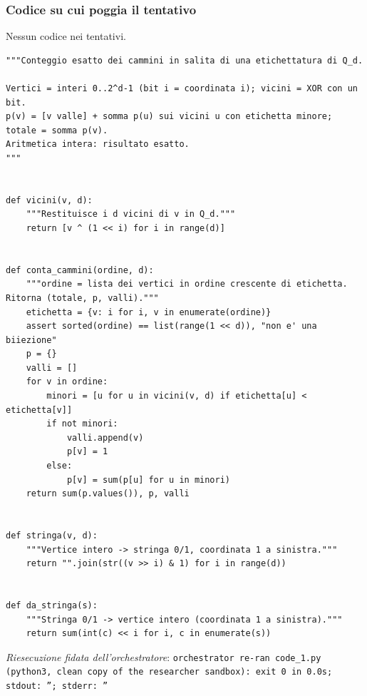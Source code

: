 \documentclass[11pt,a4paper]{article}
\begin{document}
\subsubsection{Codice su cui poggia il tentativo}
Nessun codice nei tentativi.
\begin{lstlisting}[caption={attempt\_001 code\_1 [python, rigore exact] — Exact count of uphill paths of a labelling of Q\_d via the recursion p(v) = [valley] + sum  — approvato dal Referee}]
"""Conteggio esatto dei cammini in salita di una etichettatura di Q_d.

Vertici = interi 0..2^d-1 (bit i = coordinata i); vicini = XOR con un bit.
p(v) = [v valle] + somma p(u) sui vicini u con etichetta minore; totale = somma p(v).
Aritmetica intera: risultato esatto.
"""


def vicini(v, d):
    """Restituisce i d vicini di v in Q_d."""
    return [v ^ (1 << i) for i in range(d)]


def conta_cammini(ordine, d):
    """ordine = lista dei vertici in ordine crescente di etichetta. Ritorna (totale, p, valli)."""
    etichetta = {v: i for i, v in enumerate(ordine)}
    assert sorted(ordine) == list(range(1 << d)), "non e' una biiezione"
    p = {}
    valli = []
    for v in ordine:
        minori = [u for u in vicini(v, d) if etichetta[u] < etichetta[v]]
        if not minori:
            valli.append(v)
            p[v] = 1
        else:
            p[v] = sum(p[u] for u in minori)
    return sum(p.values()), p, valli


def stringa(v, d):
    """Vertice intero -> stringa 0/1, coordinata 1 a sinistra."""
    return "".join(str((v >> i) & 1) for i in range(d))


def da_stringa(s):
    """Stringa 0/1 -> vertice intero (coordinata 1 a sinistra)."""
    return sum(int(c) << i for i, c in enumerate(s))

\end{lstlisting}
\noindent\emph{Riesecuzione fidata dell'orchestratore}: \texttt{orchestrator re-ran code\_1.py (python3, clean copy of the researcher sandbox): exit 0 in 0.0s; stdout: ''; stderr: ''}
\end{document}
